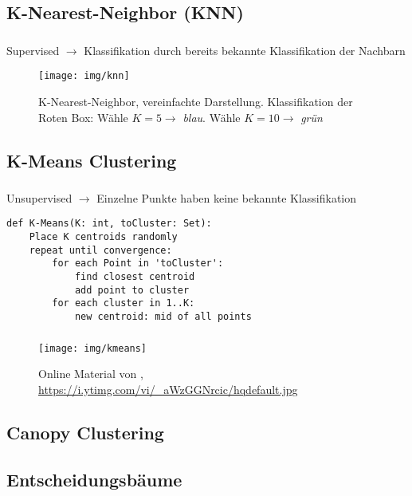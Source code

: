 \subsection{K-Nearest-Neighbor (KNN)}

\begin{frame}
    \frametitle{\insertsubsection}
    Supervised $\rightarrow$ Klassifikation durch bereits bekannte Klassifikation der Nachbarn \cite{datamining2011}
    \begin{figure}[H]
        \centering
        \texttt{[image: img/knn]}
        \caption{K-Nearest-Neighbor, vereinfachte Darstellung. Klassifikation der Roten Box: Wähle $K=5 \rightarrow$ \textit{blau}. Wähle $K=10 \rightarrow$ \textit{grün}\label{fig:knn}}
    \end{figure}
\end{frame}



\subsection{K-Means Clustering}

\begin{frame}[fragile]
    \frametitle{\insertsubsection }
    Unsupervised $\rightarrow$ Einzelne Punkte haben keine bekannte Klassifikation \cite{datamining2011}
    \vspace{1em}
    \begin{lstlisting}
def K-Means(K: int, toCluster: Set):
    Place K centroids randomly
    repeat until convergence:
        for each Point in 'toCluster':
            find closest centroid
            add point to cluster
        for each cluster in 1..K:
            new centroid: mid of all points
    \end{lstlisting}
    \cite{lavrenko2013}
\end{frame}

\begin{frame}[fragile]
    \frametitle{\insertsubsection}

    \begin{figure}[H]
        \centering
        \texttt{[image: img/kmeans]}
        \caption{Online Material von \cite{lavrenko2013}, \url{https://i.ytimg.com/vi/_aWzGGNrcic/hqdefault.jpg}\label{fig:kmeans}}
    \end{figure}
\end{frame}

\subsection{Canopy Clustering}


\subsection{Entscheidungsbäume}